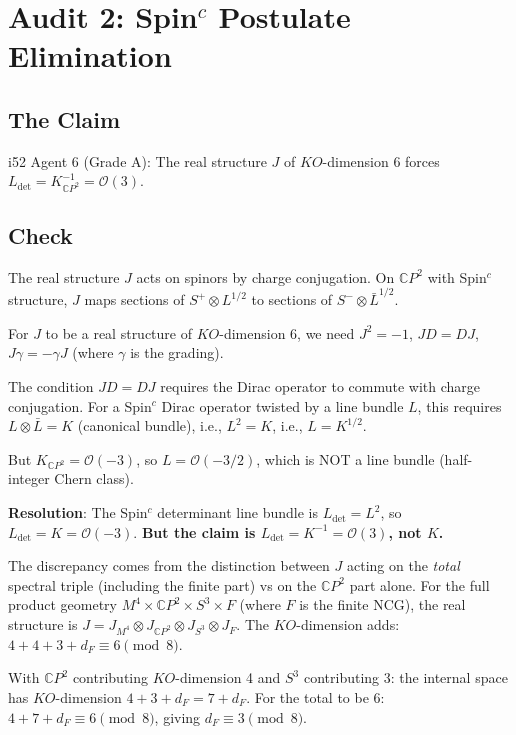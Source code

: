 \documentclass[11pt,a4paper]{article}
\newcommand{\CP}{\mathbb{C}P}
\begin{document}
\section{Audit 2: Spin$^c$ Postulate Elimination}

\subsection{The Claim}

i52 Agent 6 (Grade A): The real structure $J$ of $KO$-dimension 6 forces $L_{\det} = K_{\CP^2}^{-1} = \mathcal{O}(3)$.

\subsection{Check}

The real structure $J$ acts on spinors by charge conjugation. On $\CP^2$ with Spin$^c$ structure, $J$ maps sections of $S^+ \otimes L^{1/2}$ to sections of $S^- \otimes \bar{L}^{1/2}$.

For $J$ to be a real structure of $KO$-dimension 6, we need $J^2 = -1$, $JD = DJ$, $J\gamma = -\gamma J$ (where $\gamma$ is the grading).

The condition $JD = DJ$ requires the Dirac operator to commute with charge conjugation. For a Spin$^c$ Dirac operator twisted by a line bundle $L$, this requires $L \otimes \bar{L} = K$ (canonical bundle), i.e., $L^2 = K$, i.e., $L = K^{1/2}$.

But $K_{\CP^2} = \mathcal{O}(-3)$, so $L = \mathcal{O}(-3/2)$, which is NOT a line bundle (half-integer Chern class).

\textbf{Resolution}: The Spin$^c$ determinant line bundle is $L_{\det} = L^2$, so $L_{\det} = K = \mathcal{O}(-3)$. \textbf{But the claim is $L_{\det} = K^{-1} = \mathcal{O}(3)$, not $K$.}

The discrepancy comes from the distinction between $J$ acting on the \emph{total} spectral triple (including the finite part) vs on the $\CP^2$ part alone. For the full product geometry $M^4 \times \CP^2 \times S^3 \times F$ (where $F$ is the finite NCG), the real structure is $J = J_{M^4} \otimes J_{\CP^2} \otimes J_{S^3} \otimes J_F$. The $KO$-dimension adds: $4 + 4 + 3 + d_F \equiv 6 \pmod{8}$.

With $\CP^2$ contributing $KO$-dimension 4 and $S^3$ contributing 3: the internal space has $KO$-dimension $4 + 3 + d_F = 7 + d_F$. For the total to be 6: $4 + 7 + d_F \equiv 6 \pmod{8}$, giving $d_F \equiv 3 \pmod{8}$.
\end{document}
